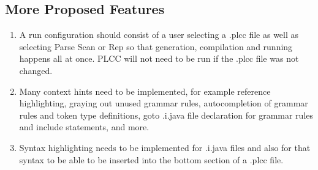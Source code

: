 \documentclass[conference, letterpaper]{IEEEtran}
\begin{document}
\subsection{More Proposed Features}\label{subsec:more-proposed-features}
\begin{enumerate}
    \item A run configuration should consist of a user selecting a .plcc file as well as selecting Parse Scan or Rep so that generation, compilation and running happens all at once.
    PLCC will not need to be run if the .plcc file was not changed.
    \item Many context hints need to be implemented, for example reference highlighting, graying out unused grammar rules, autocompletion of grammar rules and token type definitions, goto .i.java file declaration for grammar rules and include statements, and more.
    \item Syntax highlighting needs to be implemented for .i.java files and also for that syntax to be able to be inserted into the bottom section of a .plcc file.
\end{enumerate}





%
%









%
%
% 
% 




\end{document}

